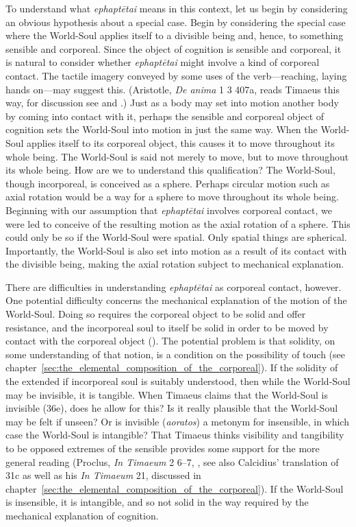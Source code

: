 To understand what \emph{ephaptētai} means in this context, let us begin by considering an obvious hypothesis about a special case. Begin by considering the special case where the World-Soul applies itself to a divisible being and, hence, to something sensible and corporeal. Since the object of cognition is sensible and corporeal, it is natural to consider whether \emph{ephaptētai} might involve a kind of corporeal contact. The tactile imagery conveyed by some uses of the verb---reaching, laying hands on---may suggest this. (Aristotle, \emph{De anima} 1 3 407a, reads Timaeus this way, for discussion see \citealt[392--5, 404--7]{Cherniss:1944aa} and \citealt[82--6]{Lee:1976xs}.) Just as a body may set into motion another body by coming into contact with it, perhaps the sensible and corporeal object of cognition sets the World-Soul into motion in just the same way. When the World-Soul applies itself to its corporeal object, this causes it to move throughout its whole being. The World-Soul is said not merely to move, but to move throughout its whole being. How are we to understand this qualification? The World-Soul, though incorporeal, is conceived as a sphere. Perhaps circular motion such as axial rotation would be a way for a sphere to move throughout its whole being. Beginning with our assumption that \emph{ephaptētai} involves corporeal contact, we were led to conceive of the resulting motion as the axial rotation of a sphere. This could only be so if the World-Soul were spatial. Only spatial things are spherical. Importantly, the World-Soul is also set into motion as a result of its contact with the divisible being, making the axial rotation subject to mechanical explanation.

There are difficulties in understanding \emph{ephaptētai} as corporeal contact, however. One potential difficulty concerns the mechanical explanation of the motion of the World-Soul. Doing so requires the corporeal object to be solid and offer resistance, and the incorporeal soul to itself be solid in order to be moved by contact with the corporeal object (\citealt[129--33]{Betegh:2019fq}). The potential problem is that solidity, on some understanding of that notion, is a condition on the possibility of touch (see chapter~\ref{sec:the_elemental_composition_of_the_corporeal}). If the solidity of the extended if incorporeal soul is suitably understood, then while the World-Soul may be invisible, it is tangible. When Timaeus claims that the World-Soul is invisible (36e), does he allow for this? Is it really plausible that the World-Soul may be felt if unseen? Or is invisible (\emph{aoratos}) a metonym for insensible, in which case the World-Soul is intangible? That Timaeus thinks visibility and tangibility to be opposed extremes of the sensible provides some support for the more general reading (Proclus, \emph{In Timaeum} 2 6--7, \citealt{Diehl:1903re}, see also Calcidius' translation of 31c as well as his \emph{In Timaeum} 21, discussed in chapter~\ref{sec:the_elemental_composition_of_the_corporeal}). If the World-Soul is insensible, it is intangible, and so not solid in the way required by the mechanical explanation of cognition. 

